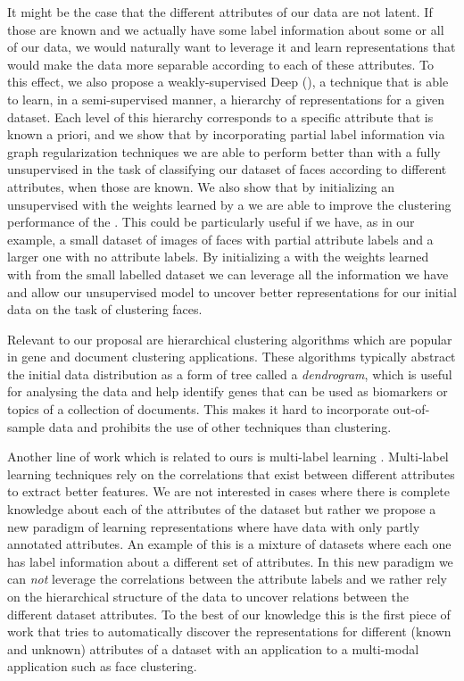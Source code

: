 \documentclass[10pt,journal,compsoc]{IEEEtran}
\begin{document}
It might be the case that the different attributes of our data are not latent. If those are known and we actually have some label information about some or all of our data, we would naturally want to leverage it and learn representations that would make the data more separable according to each of these attributes. To this effect, we also propose a weakly-supervised Deep \seminmf (\dwsf), a technique that is able to learn, in a semi-supervised manner, a hierarchy of representations for a given dataset. Each level of this hierarchy corresponds to a specific attribute that is known a priori, and we show that by incorporating partial label information via graph regularization techniques we are able to perform better than with a fully unsupervised \deepseminmf in the task of classifying our dataset of faces according to different attributes, when those are known.  We also show that by initializing an unsupervised \deepseminmf with the weights learned by a \dwsf we are able to improve the clustering performance of the \deepseminmf. This could be particularly useful if we have, as in our example, a small dataset of images of faces with partial attribute labels and a larger one with no attribute labels. By initializing a \deepseminmf with the weights learned with \dwsf from the small labelled dataset we can leverage all the information we have and allow our unsupervised model to uncover better representations for our initial data on the task of clustering faces.

Relevant to our proposal are hierarchical clustering algorithms \cite{Herrero2001,Zhao2005} which are popular in gene and document clustering applications.
These algorithms typically abstract the initial data distribution as a form of tree called a {\it dendrogram}, which is useful for analysing the data and help identify genes that can be used as biomarkers or topics of a collection of documents. This makes it hard to incorporate out-of-sample data and prohibits the use of other techniques than clustering. 

Another line of work which is related to ours is multi-label learning \cite{Tsoumakas2007}. Multi-label learning techniques rely on the correlations \cite{Zhang2010} that exist between different attributes to extract better features. We are not interested in cases where there is complete knowledge about each of the attributes of the dataset but rather we propose a new paradigm of learning representations where have data with only partly annotated attributes. An example of this is a mixture of datasets where each one has label information about a different set of attributes. In this new paradigm we can {\it not} leverage the correlations between the attribute labels and we rather rely on the hierarchical structure of the data to uncover relations between the different dataset attributes.  To the best of our knowledge this is the first piece of work that tries to automatically discover the representations for different (known and unknown) attributes of a dataset with an application to a multi-modal application such as face clustering.
\end{document}
